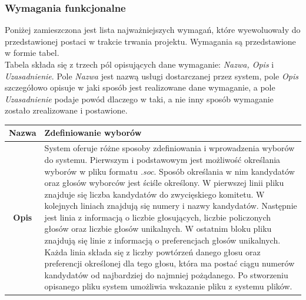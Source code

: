 \documentclass[polish,11pt]{aghthesis}
\begin{document}
\subsubsection{Wymagania funkcjonalne}
Poniżej zamieszczona jest lista najważniejszych wymagań, które wyewoluowały do przedstawionej postaci w trakcie trwania projektu. Wymagania są przedstawione w formie tabel.\\
Tabela składa się z trzech pól opisujących dane wymaganie: \textit{Nazwa, Opis} i \textit{Uzasadnienie}. Pole \textit{Nazwa} jest nazwą usługi dostarczanej przez system, pole \textit{Opis} szczegółowo opisuje w jaki sposób jest realizowane dane wymaganie, a pole \textit{Uzasadnienie} podaje powód dlaczego w taki, a nie inny sposób wymaganie zostało zrealizowane i postawione.
\newpage
\begin{table}
\centering
\begin{tabular}{|c|p{12.5cm}|}
\hline
\textbf{Nazwa} & Zdefiniowanie wyborów \\ 
\hline 
\textbf{Opis} & System oferuje różne sposoby zdefiniowania i wprowadzenia wyborów
do systemu. Pierwszym i podstawowym jest możliwość określania
wyborów w pliku formatu \textit{.soc}. Sposób określania w nim kandydatów
oraz głosów wyborców jest ściśle określony. W pierwszej linii pliku
znajduje się liczba kandydatów do zwycięskiego komitetu. W kolejnych
liniach znajdują się numery i nazwy kandydatów. Następnie jest linia z
informacją o liczbie głosujących, liczbie policzonych głosów oraz liczbie
głosów unikalnych. W ostatnim bloku pliku znajdują się linie z
informacją o preferencjach głosów unikalnych. Każda linia składa się z
liczby powtórzeń danego głosu oraz preferencji określonej dla tego
głosu, która ma postać ciągu numerów kandydatów od najbardziej do
najmniej pożądanego. Po stworzeniu opisanego pliku system umożliwia
wskazanie pliku z systemu plików.


\end{tabular}
\end{table}
\end{document}
